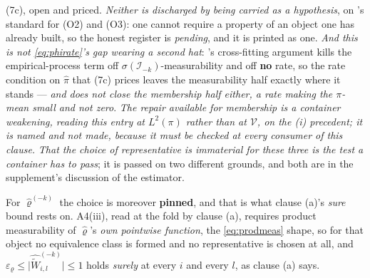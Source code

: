 \begin{definition}
\begin{enumerate}
\begin{enumerate}
\textup{(7c)}, open and priced. \emph{Neither is discharged by being carried
as a hypothesis}, on 's standard for \textup{(O2)} and \textup{(O3)}: one
cannot require a property of an object one has already built, so the honest register is \emph{pending},
and it is printed as one. \emph{And this is not \eqref{eq:phirate}'s gap wearing a second hat}:
's cross-fitting argument kills the empirical-process term off
$\sigma(\mathcal I_{-k})$-measurability and off \textbf{no} rate, so the rate condition on $\hat\pi$ that
\textup{(7c)} prices leaves the measurability half exactly where it stands --- \emph{and does not close
the membership half either, a rate making the $\pi$-mean small and not zero}. \emph{The repair available
for membership is a container weakening, reading this entry at $L^{2}(\pi)$ rather than at $\mathcal V$,
on the \textup{(i)} precedent; it is named and not made, because it must be
checked at every consumer of this clause.}
\emph{That the choice of representative is immaterial for these three is the test a container has to pass};
it is passed on two different grounds, and both are in the supplement's discussion of the estimator.

For $\hat\varrho^{(-k)}$ the choice is moreover \textbf{pinned}, and that is what clause
\textup{(a)}'s \emph{sure} bound rests on. A4(iii), read at the fold by
clause \textup{(a)}, requires product measurability of $\hat\varrho$'s \emph{own pointwise function}, 
the \eqref{eq:prodmeas} shape, so for that object no equivalence class is formed and
no representative is chosen at all, and
$\varepsilon_\varrho\le\big|\widehat{\widetilde W}^{(-k)}_{i,l}\big|\le1$ holds \emph{surely} at every $i$
and every $l$, as clause \textup{(a)} says.


\end{enumerate}
\end{enumerate}
\end{definition}
